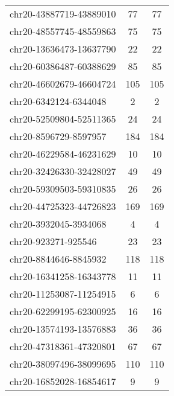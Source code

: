 \begin{longtable}{lSS}
	chr20-43887719-43889010 & 77     & 77                                        \\
	chr20-48557745-48559863 & 75     & 75                                        \\
	chr20-13636473-13637790 & 22     & 22                                        \\
	chr20-60386487-60388629 & 85     & 85                                        \\
	chr20-46602679-46604724 & 105    & 105                                       \\
	chr20-6342124-6344048   & 2      & 2                                         \\
	chr20-52509804-52511365 & 24     & 24                                        \\
	chr20-8596729-8597957   & 184    & 184                                       \\
	chr20-46229584-46231629 & 10     & 10                                        \\
	chr20-32426330-32428027 & 49     & 49                                        \\
	chr20-59309503-59310835 & 26     & 26                                        \\
	chr20-44725323-44726823 & 169    & 169                                       \\
	chr20-3932045-3934068   & 4      & 4                                         \\
	chr20-923271-925546     & 23     & 23                                        \\
	chr20-8844646-8845932   & 118    & 118                                       \\
	chr20-16341258-16343778 & 11     & 11                                        \\
	chr20-11253087-11254915 & 6      & 6                                         \\
	chr20-62299195-62300925 & 16     & 16                                        \\
	chr20-13574193-13576883 & 36     & 36                                        \\
	chr20-47318361-47320801 & 67     & 67                                        \\
	chr20-38097496-38099695 & 110    & 110                                       \\
	chr20-16852028-16854617 & 9      & 9                                         \\

\end{longtable}
